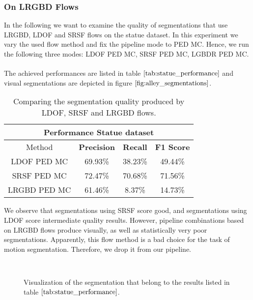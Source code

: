 \subsubsection{On LRGBD Flows}
In the following we want to examine the quality of segmentations that use LRGBD, LDOF and SRSF flows on the statue dataset. In this experiment we vary the used flow method and fix the pipeline mode to PED MC. Hence, we run the following three modes: LDOF PED MC, SRSF PED MC, LGBDR PED MC. \\ \\
The achieved performances are listed in table $\ref{tab:statue_performance}$ and visual segmentations are depicted in figure $\ref{fig:alley_segmentations}$.
\begin{table}[H]
\centering
\begin{tabular}{|c|c|c|c|}
\hline
\multicolumn{4}{|c|}{Performance Statue dataset}                        \\ \hline
Method & \textbf{Precision} & \textbf{Recall} & \textbf{F1 Score} \\ \hline
LDOF PED MC & 69.93\%   & 38.23\%     & 49.44\%  \\ \hline
SRSF PED MC & 72.47\%   & 70.68\%     & 71.56\%  \\ \hline
LRGBD PED MC & 61.46\%   & 8.37\%     & 14.73\%  \\ \hline              
\end{tabular}
\caption[Performance Statue]{Comparing the segmentation quality produced by LDOF, SRSF and LRGBD flows.}
\label{tab:statue_performance}
\end{table}
We observe that segmentations using SRSF score good, and segmentations using LDOF score intermediate quality results. However, pipeline combinations based on LRGBD flows produce visually, as well as statistically very poor segmentations. Apparently, this flow method is a bad choice for the task of motion segmentation. Therefore, we drop it from our pipeline. 
\begin{figure}[H]
\begin{center}
~
\end{center}
\caption[Bonn Cerealbox Segmentations]{Visualization of the segmentation that belong to the results listed in table $\ref{tab:statue_performance}$.}
\label{fig:alley_segmentations}
\end{figure}
